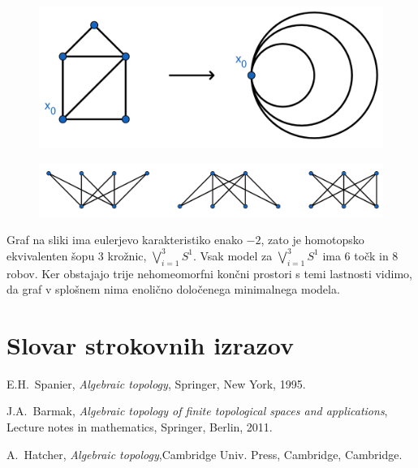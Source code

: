 \documentclass[mat1]{fmfdelo}
\DeclareRobustCommand{\h}{
    \mathcal{H}}
\DeclareRobustCommand{\pot}{
    $\h-$pot
}
\begin{document}
\begin{primer}
    \begin{figure}[h]
        \centering
        \includegraphics[width=0.55\linewidth]{v3.png}
    \end{figure}
    \begin{figure}[h]
        \centering
        \includegraphics[width=0.8\linewidth]{grafi.png}
    \end{figure}

    Graf na sliki ima eulerjevo karakteristiko enako $-2$, zato je homotopsko ekvivalenten šopu $3$ krožnic, $\bigvee\limits_{i=1}^{3}S^1$. Vsak model za $\bigvee\limits_{i=1}^{3}S^1$ ima $6$ točk in $8$ robov. Ker obstajajo trije nehomeomorfni končni prostori s temi lastnosti vidimo, da graf v splošnem nima enolično določenega minimalnega modela.
\end{primer}

\section*{Slovar strokovnih izrazov}


\geslo{$\h-$path}{\pot}


\begin{thebibliography}{99}

E.H.~Spanier, \emph{Algebraic topology}, Springer, New York, 1995.

J.A.~Barmak, \emph{Algebraic topology of finite topological spaces and applications}, Lecture notes in mathematics, Springer, Berlin, 2011.

A.~Hatcher, \emph{Algebraic topology},Cambridge Univ. Press, Cambridge, Cambridge.



\end{thebibliography}
\end{document}
